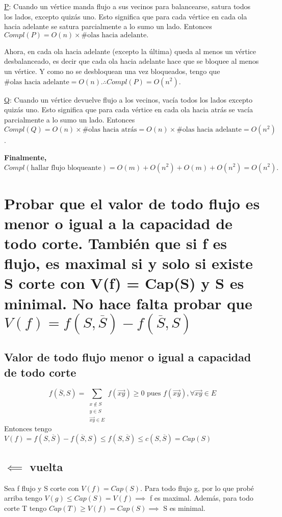 \documentclass[11pt]{article}
\begin{document}
\uline{P}:
Cuando un vértice manda flujo a sus vecinos para balancearse, satura todos los lados, excepto quizás uno. Esto significa que para cada vértice en cada ola hacia adelante se satura parcialmente a lo sumo un lado. Entonces \(Compl(P) = O(n) \times \# \text{olas hacia adelante}.\)

Ahora, en cada ola hacia adelante (excepto la última) queda al menos un vértice desbalanceado, es decir que cada ola hacia adelante hace que se bloquee al menos un vértice. Y como no se desbloquean una vez bloqueados, tengo que \(\# \text{olas hacia adelante} = O(n). \therefore Compl(P) = O(n^2)\).

\uline{Q}:
Cuando un vértice devuelve flujo a los vecinos, vacía todos los lados excepto quizás uno. Esto significa que para cada vértice en cada ola hacia atrás se vacía parcialmente a lo sumo un lado. Entonces \(Compl(Q) = O(n) \times \# \text{olas hacia atrás} = O(n) \times \# \text{olas hacia adelante} = O(n^2)\).

\textbf{Finalmente,
\[Compl(\text{hallar flujo bloqueante}) = O(m) + O(n^2) + O(m) + O(n^2) = O(n^2).\]}


\section{Probar que el valor de todo flujo es menor o igual a la capacidad de todo corte. También que si f es flujo, es maximal si y solo si existe S corte con V(f) = Cap(S) y S es minimal. No hace falta probar que \(V(f) = f(S, \overline{S}) - f(\overline{S}, S)\)}
\label{sec:orgc0c45a0}
\subsection{Valor de todo flujo menor o igual a capacidad de todo corte}
\label{sec:orga6ea598}
\[
f(\overline{S}, S) = \sum_{\substack{x \not\in S \\ y \in S \\ \overrightarrow{xy} \in E}} f(\overrightarrow{xy}) \ge 0 \text{ pues } f(\overrightarrow{xy}), \forall \overrightarrow{xy} \in E
\]
Entonces tengo \(V(f) = f(S, \overline{S}) - f(\overline{S}, S) \le f(S, \overline{S}) \le c(S, \overline{S}) = Cap(S)\)

\subsection{\(\impliedby\) vuelta}
\label{sec:orgf6f3e8b}
Sea f flujo y S corte con \(V(f) = Cap(S)\). Para todo flujo g, por lo que probé arriba tengo \(V(g) \le Cap(S) = V(f) \implies\) f es maximal. Además, para todo corte T tengo \(Cap(T) \ge V(f) = Cap(S) \implies\) S es minimal.
\end{document}
